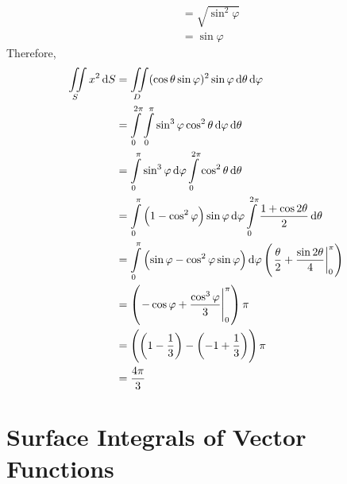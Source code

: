 \documentclass[fleqn, a4paper, 12pt, twoside]{article}
\theoremstyle{definition}
\theoremstyle{theorem}
\begin{document}
{\begin{solution}
\begin{align*}
                                                                                   & = \sqrt{\sin^2 \varphi}                                                                              \\
                                                                                   & = \sin \varphi
	\end{align*}
	Therefore,
	\begin{align*}
		\iint\limits_{S} x^2 \dif S & = \iint\limits_{D} (\cos \theta \sin \varphi)^2 \sin \varphi \dif \theta \dif \varphi                                                                                             \\
                                            & = \int\limits_{0}^{2 \pi} \int\limits_{0}^{\pi} \sin^3 \varphi \cos^2 \theta \dif \varphi \dif \theta                                                                             \\
                                            & = \int\limits_{0}^{\pi} \sin^3 \varphi \dif \varphi \int\limits_{0}^{2 \pi} \cos^2 \theta \dif \theta                                                                             \\
                                            & = \int\limits_{0}^{\pi} \left( 1 - \cos^2 \varphi \right) \sin \varphi \dif \varphi \int\limits_{0}^{2 \pi} \frac{1 + \cos 2 \theta}{2} \dif \theta                               \\
                                            & = \int\limits_{0}^{\pi} \left( \sin \varphi - \cos^2 \varphi \sin \varphi \right) \dif \varphi \left( \left. \frac{\theta}{2} + \frac{\sin 2 \theta}{4} \right|_{0}^{\pi} \right) \\
                                            & = \left( \left. -\cos \varphi + \frac{\cos^3 \varphi}{3} \right|_{0}^{\pi} \right) \pi                                                                                            \\
                                            & = \left( \left( 1 - \frac{1}{3} \right) - \left( -1 + \frac{1}{3} \right) \right) \pi                                                                                             \\
                                            & = \frac{4 \pi}{3}
	\end{align*}
\end{solution}

\section{Surface Integrals of Vector Functions}

}
\end{document}
